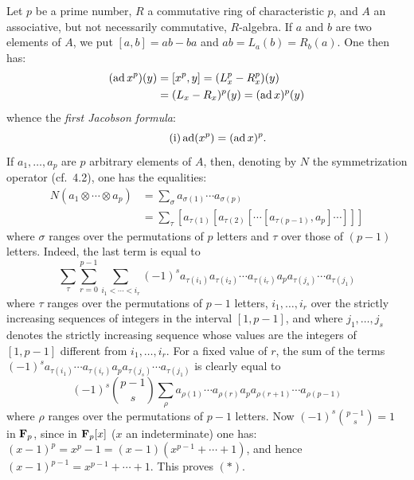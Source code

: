 Let $p$ be a prime number, $R$ a commutative ring of characteristic $p$, and $A$ an associative, but not necessarily commutative, $R$-algebra. If $a$ and $b$ are two elements of $A$, we put $[a,b]=ab-ba$ and $ab=L_a(b)=R_b(a)$. One then has:
\[
\begin{aligned}
(\operatorname{ad} x^p)(y)&=[x^p,y]=(L_x^p-R_x^p)(y)\\
&=(L_x-R_x)^p(y)=(\operatorname{ad} x)^p(y)
\end{aligned}
\]
whence the \emph{first Jacobson formula}:
\begin{equation}\tag{i}\operatorname{ad}(x^p)=(\operatorname{ad} x)^p.\end{equation}
If $a_1,\ldots,a_p$ are $p$ arbitrary elements of $A$, then, denoting by $N$ the symmetrization operator (cf.\ 4.2), one has the equalities:
\begin{equation}\tag{$*$}
\begin{aligned}
N(a_1\otimes\cdots\otimes a_p)&=\sum_\sigma a_{\sigma(1)}\cdots a_{\sigma(p)}\\
&=\sum_\tau[a_{\tau(1)}[a_{\tau(2)}[\cdots[a_{\tau(p-1)},a_p]\cdots]]]
\end{aligned}
\end{equation}
where $\sigma$ ranges over the permutations of $p$ letters and $\tau$ over those of $(p-1)$ letters. Indeed, the last term is equal to
\[
\sum_\tau\sum_{r=0}^{p-1}\sum_{i_1<\cdots<i_r}(-1)^s a_{\tau(i_1)}a_{\tau(i_2)}\cdots a_{\tau(i_r)}a_pa_{\tau(j_s)}\cdots a_{\tau(j_1)}
\]
where $\tau$ ranges over the permutations of $p-1$ letters, $i_1,\ldots,i_r$ over the strictly increasing sequences of integers in the interval $[1,p-1]$, and where $j_1,\ldots,j_s$ denotes the strictly increasing sequence whose values are the integers of $[1,p-1]$ different from $i_1,\ldots,i_r$. For a fixed value of $r$, the sum of the terms $(-1)^sa_{\tau(i_1)}\cdots a_{\tau(i_r)}a_pa_{\tau(j_s)}\cdots a_{\tau(j_1)}$ is clearly equal to
\[
(-1)^s\binom{p-1}{s}\sum_\rho a_{\rho(1)}\cdots a_{\rho(r)}a_pa_{\rho(r+1)}\cdots a_{\rho(p-1)}
\]
where $\rho$ ranges over the permutations of $p-1$ letters. Now $(-1)^s\binom{p-1}{s}=1$ in $\mathbf{F}_p$, since in $\mathbf{F}_p[x]$ ($x$ an indeterminate) one has: $(x-1)^p=x^p-1=(x-1)(x^{p-1}+\cdots+1)$, and hence $(x-1)^{p-1}=x^{p-1}+\cdots+1$. This proves $(*)$.

